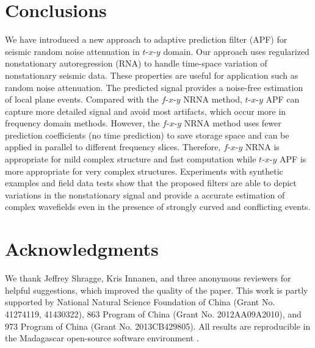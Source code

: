
\section{Conclusions}
We have introduced a new approach to adaptive prediction filter (APF)
for seismic random noise attenuation in $t$-$x$-$y$ domain. Our
approach uses regularized nonstationary autoregression (RNA) to handle
time-space variation of nonstationary seismic data. These properties
are useful for application such as random noise attenuation. The
predicted signal provides a noise-free estimation of local plane
events. Compared with the $f$-$x$-$y$ NRNA method, $t$-$x$-$y$ APF can
capture more detailed signal and avoid most artifacts, which occur
more in frequency domain methods. However, the $f$-$x$-$y$ NRNA method
uses fewer prediction coefficients (no time prediction) to save
storage space and can be applied in parallel to different frequency
slices. Therefore, $f$-$x$-$y$ NRNA is appropriate for mild complex
structure and fast computation while $t$-$x$-$y$ APF is more
appropriate for very complex structures.  Experiments with synthetic
examples and field data tests show that the proposed filters are able
to depict variations in the nonstationary signal and provide a
accurate estimation of complex wavefields even in the presence of
strongly curved and conflicting events.

\section{Acknowledgments}
We thank Jeffrey Shragge, Kris Innanen, and three 
anonymous reviewers for helpful suggestions, which improved the
quality of the paper. This work is partly supported by National
Natural Science Foundation of China (Grant No. 41274119, 41430322),
863 Program of China (Grant No. 2012AA09A2010), and 973 Program
of China (Grant No. 2013CB429805). All results are reproducible in the
Madagascar open-source software environment \cite[]{m8r}.




